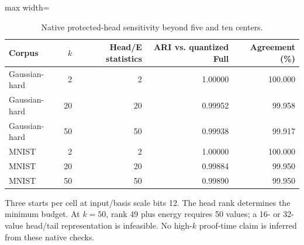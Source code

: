 \begin{table}[tp]
\caption{Native protected-head sensitivity beyond five and ten centers.}\label{tab:centers}
\centering\small
\begin{adjustbox}{max width=\textwidth}
\begin{tabular}{@{}lrrrr@{}}
\toprule
Corpus & $k$ & Head/E statistics & ARI vs. quantized Full & Agreement (\%) \\
\midrule
Gaussian-hard & 2 & 2 & 1.00000 & 100.000 \\
Gaussian-hard & 20 & 20 & 0.99952 & 99.958 \\
Gaussian-hard & 50 & 50 & 0.99938 & 99.917 \\
MNIST & 2 & 2 & 1.00000 & 100.000 \\
MNIST & 20 & 20 & 0.99884 & 99.950 \\
MNIST & 50 & 50 & 0.99890 & 99.950 \\
\bottomrule
\end{tabular}
\end{adjustbox}
\par\vspace{3pt}\begin{minipage}{0.98\textwidth}\footnotesize Three starts per cell at input/basis scale bits 12. The head rank determines the minimum budget. At $k=50$, rank 49 plus energy requires 50 values; a 16- or 32-value head/tail representation is infeasible. No high-$k$ proof-time claim is inferred from these native checks.\end{minipage}
\end{table}
